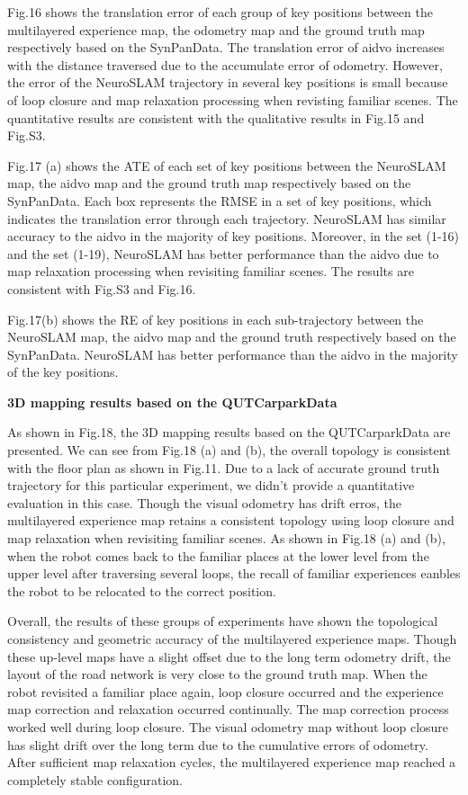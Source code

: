 Fig.16 shows the translation error of each group of key positions between the multilayered experience map, the odometry map and the ground truth map respectively based on the SynPanData.
The translation error of aidvo increases with the distance traversed due to the accumulate error of odometry.
However, the error of the NeuroSLAM trajectory in several key positions is small because of loop closure and map relaxation processing when revisting familiar scenes.
The quantitative results are consistent with the qualitative results in Fig.15 and Fig.S3.


Fig.17 (a) shows the ATE of each set of key positions between the NeuroSLAM map, the aidvo map and the ground truth map respectively based on the SynPanData.
Each box represents the RMSE in a set of key positions, which indicates the translation error through each trajectory.
NeuroSLAM has similar accuracy to the aidvo in the majority of key positions.
Moreover, in the set (1-16) and the set (1-19), NeuroSLAM has better performance than the aidvo due to map relaxation processing when revisiting familiar scenes.
The results are consistent with Fig.S3 and Fig.16.


Fig.17(b) shows the RE of key positions in each sub-trajectory between the NeuroSLAM map, the aidvo map and the ground truth respectively based on the SynPanData.
NeuroSLAM has better performance than the aidvo in the majority of the key positions.





\noindent \textbf{3D mapping results based on the QUTCarparkData}

As shown in Fig.18, the 3D mapping results based on the QUTCarparkData are presented.
We can see from Fig.18 (a) and (b), the overall topology is consistent with the floor plan as shown in Fig.11.
Due to a lack of accurate ground truth trajectory for this particular experiment, we didn't provide a quantitative evaluation in this case.
Though the visual odometry has drift erros, the multilayered experience map retains a consistent topology using loop closure and map relaxation when revisiting familiar scenes.
As shown in Fig.18 (a) and (b), when the robot comes back to the familiar places at the lower level from the upper level after traversing several loops, the recall of familiar experiences eanbles the robot to be relocated to the correct position.


Overall, the results of these groups of experiments have shown the topological consistency and geometric accuracy of the multilayered experience maps.
Though these up-level maps have a slight offset due to the long term odometry drift, the layout of the road network is very close to the ground truth map.
When the robot revisited a familiar place again, loop closure occurred and the experience map correction and relaxation occurred continually.
The map correction process worked well during loop closure.
The visual odometry map without loop closure has slight drift over the long term due to the cumulative errors of odometry.
After sufficient map relaxation cycles, the multilayered experience map reached a completely stable configuration.



